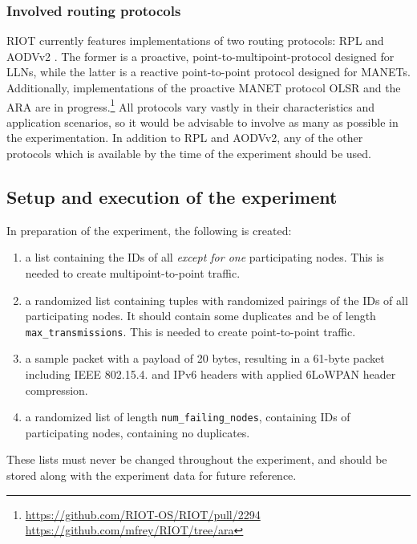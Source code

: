 \documentclass{acm_proc_article-sp}
\begin{document}
\subsubsection{Involved routing protocols}
\label{subsec:protocols}
RIOT currently features implementations of two routing protocols: RPL \cite{RFC-6550} and AODVv2 \cite{draft-ietf-manet-aodvv2-09}. The former is a proactive, point-to-multipoint-protocol designed for \glspl{LLN}, while the latter is a reactive point-to-point protocol designed for \glspl{MANET}. Additionally, implementations of the proactive \gls{MANET} protocol OLSR\cite{RFC-3626} and the \gls{ARA}\cite{ara} are in progress.\footnote{ \url{https://github.com/RIOT-OS/RIOT/pull/2294}\\  \url{https://github.com/mfrey/RIOT/tree/ara}}
All protocols vary vastly in their characteristics and application scenarios, so it would be advisable to involve as many as possible in the experimentation. In addition to RPL and AODVv2, any of the other protocols which is available by the time of the experiment should be used.

\subsection{Setup and execution of the experiment}
\label{subsec:setup}
In preparation of the experiment, the following is created:
\begin{enumerate}
\item a list containing the IDs of all \emph{except for one} participating nodes. This is needed to create multipoint-to-point traffic.
\item a randomized list containing tuples with randomized pairings of the IDs of all participating nodes. It should contain some duplicates and be of length \texttt{max\_transmissions}. This is needed to create point-to-point traffic.
\item a sample packet with a payload of 20 bytes, resulting in a 61-byte packet including IEEE 802.15.4. and IPv6 headers with applied 6LoWPAN header compression.
\item a randomized list of length \texttt{num\_failing\_nodes}, containing IDs of participating nodes, containing no duplicates.
\end{enumerate}
These lists must never be changed throughout the experiment, and should be stored along with the experiment data for future reference.\\
\end{document}
